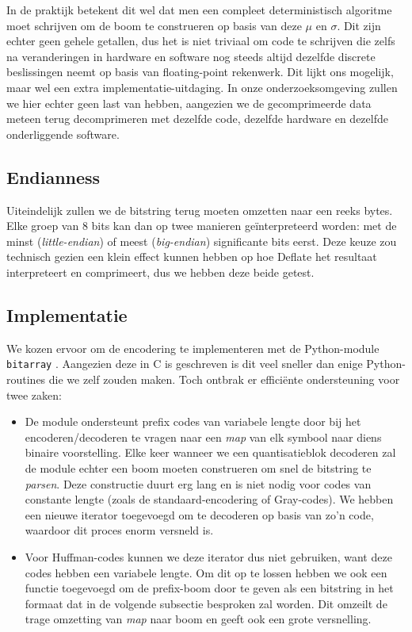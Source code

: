\begin{itemize}
In de praktijk betekent dit wel dat men een compleet deterministisch algoritme moet schrijven om de boom te construeren op basis van deze $\mu$ en $\sigma$. Dit zijn echter geen gehele getallen, dus het is niet triviaal om code te schrijven die zelfs na veranderingen in hardware en software nog steeds altijd dezelfde discrete beslissingen neemt op basis van floating-point rekenwerk. Dit lijkt ons mogelijk, maar wel een extra implementatie-uitdaging. In onze onderzoeksomgeving zullen we hier echter geen last van hebben, aangezien we de gecomprimeerde data meteen terug decomprimeren met dezelfde code, dezelfde hardware en dezelfde onderliggende software.

\end{itemize}

\subsection{Endianness}

Uiteindelijk zullen we de bitstring terug moeten omzetten naar een reeks bytes. Elke groep van 8 bits kan dan op twee manieren ge\"interpreteerd worden: met de minst (\textit{little-endian}) of meest (\textit{big-endian}) significante bits eerst. Deze keuze zou technisch gezien een klein effect kunnen hebben op hoe Deflate het resultaat interpreteert en comprimeert, dus we hebben deze beide getest.

\subsection{Implementatie}

We kozen ervoor om de encodering te implementeren met de Python-module \texttt{bitarray} \cite{ref:bitarray}. Aangezien deze in C is geschreven is dit veel sneller dan enige Python-routines die we zelf zouden maken. Toch ontbrak er effici\"ente ondersteuning voor twee zaken:

\begin{itemize}

\item De module ondersteunt prefix codes van variabele lengte \cite{ref:variable_length_code} door bij het encoderen/decoderen te vragen naar een \textit{map} van elk symbool naar diens binaire voorstelling. Elke keer wanneer we een quantisatieblok decoderen zal de module echter een boom moeten construeren om snel de bitstring te \textit{parsen}. Deze constructie duurt erg lang en is niet nodig voor codes van constante lengte (zoals de standaard-encodering of Gray-codes). We hebben een nieuwe iterator toegevoegd om te decoderen op basis van zo'n code, waardoor dit proces enorm versneld is.

\item Voor Huffman-codes \cite{ref:huffman_coding} kunnen we deze iterator dus niet gebruiken, want deze codes hebben een variabele lengte. Om dit op te lossen hebben we ook een functie toegevoegd om de prefix-boom door te geven als een bitstring in het formaat dat in de volgende subsectie besproken zal worden. Dit omzeilt de trage omzetting van \textit{map} naar boom en geeft ook een grote versnelling.

\end{itemize}

